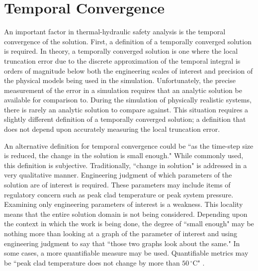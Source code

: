\section{Temporal Convergence}
\label{sect:temporal_convergence}

An important factor in thermal-hydraulic safety analysis is the temporal convergence of the solution.
First, a definition of a temporally converged solution is required.
In theory, a temporally converged solution is one where the local truncation error due to the discrete approximation of the temporal integral is orders of magnitude below both the engineering scales of interest and precision of the physical models being used in the simulation.
Unfortunately, the precise measurement of the error in a simulation requires that an analytic solution be available for comparison to.
During the simulation of physically realistic systems, there is rarely an analytic solution to compare against.
This situation requires a slightly different definition of a temporally converged solution; a definition that does not depend upon accurately measuring the local truncation error.

An alternative definition for temporal convergence could be ``as the time-step size is reduced, the change in the solution is small enough."
While commonly used, this definition is subjective.
Traditionally, ``change in solution" is addressed in a very qualitative manner.
Engineering judgment of which parameters of the solution are of interest is required.
These parameters may include items of regulatory concern such as peak clad temperature or peak system pressure.
Examining only engineering parameters of interest is a weakness.
This locality means that the entire solution domain is not being considered.
Depending upon the context in which the work is being done, the degree of ``small enough" may be nothing more than looking at a graph of the parameter of interest and using engineering judgment to say that ``those two graphs look about the same."
In some cases, a more quantifiable measure may be used.
Quantifiable metrics may be  ``peak clad temperature does not change by more than $50\,^{\circ}\mathrm{C}$" \cite{CFR10}.

